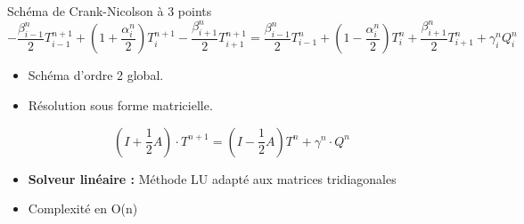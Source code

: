 \documentclass{beamer}
\begin{document}
\begin{frame}{Schéma de Crank-Nicolson à 3 points}
    \footnotesize{
    \begin{equation}
        - \frac{\beta_{i-1}^{n}}{2} T_{i-1}^{n+1} + \left(1 + \frac{\alpha_i^n}{2} \right) T_i^{n+1} - \frac{\beta_{i+1}^n}{2} T_{i+1}^{n+1} = \frac{\beta_{i-1}^n}{2} T_{i-1}^{n} + \left(1 - \frac{\alpha_i^n}{2} \right) T_i^{n} + \frac{\beta_{i+1}^n}{2} T_{i+1}^{n} + \gamma_i^n Q_i^n
    \end{equation}}


    \begin{itemize}
        \item Schéma d'ordre 2 global.
        \item Résolution sous forme matricielle.
    \end{itemize}

    \begin{equation}
            (I + \frac{1}{2}A) \cdot T^{n+1} = (I - \frac{1}{2}A)T^n + \gamma^n \cdot Q^n
    \end{equation}

    \begin{block}{}
        \begin{itemize}
        \item \textbf{Solveur linéaire :} Méthode LU adapté aux matrices tridiagonales
        \item Complexité en O(n)
        \end{itemize}
    \end{block}
\end{frame}
\end{document}
